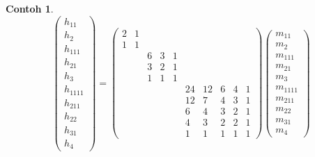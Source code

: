 \documentclass[12pt]{article}
\theoremstyle{plain}
\theoremstyle{definition}
\newtheorem{example}[theorem]{Contoh}
\theoremstyle{remark}
\numberwithin{equation}{section}
\begin{document}
\begin{example}
\[
\begin{pmatrix} h_{11}\\ h_2\\ h_{111}\\ h_{21}\\ h_3\\
h_{1111}\\ h_{211} \\ h_{22}\\ h_{31}\\ h_4
\end{pmatrix}
=
\begin{pmatrix}
2 & 1 &
 & & &
& & & & \\
1 & 1 &
 & & &
& & & & \\
 & &
6 & 3 & 1 &
& & & & \\
 & &
3 & 2 & 1 &
& & & & \\
 & &
1 & 1 & 1 &
& & & & \\
 & &
 & & &
24 & 12 & 6 & 4 & 1 \\
 & &
 & & &
12 & 7 & 4 & 3 & 1 \\
 & &
 & & &
6 & 4 & 3 & 2 & 1 \\
 & &
 & & &
4 & 3 & 2 & 2 & 1 \\
 & &
 & & &
1 & 1 & 1 & 1 & 1
\end{pmatrix} 
\begin{pmatrix} m_{11}\\ m_2\\ m_{111}\\ m_{21}\\ m_3\\
m_{1111}\\ m_{211} \\ m_{22}\\ m_{31}\\ m_4
\end{pmatrix}
\]

\end{example}
\end{document}
